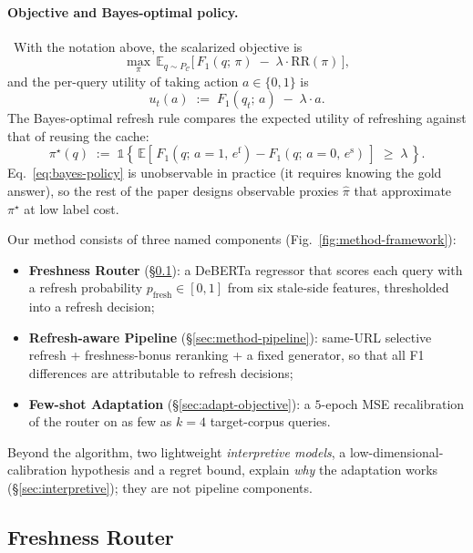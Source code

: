 \documentclass[pdflatex,sn-basic]{sn-jnl}
\begin{document}
\paragraph*{Objective and Bayes-optimal policy.}~With the notation above, the scalarized objective is
\begin{equation}
\label{eq:tradeoff}
\max_{\pi}\,\mathbb{E}_{q \sim P_{\mathcal{C}}}\big[\, F_1(q;\,\pi) \;-\; \lambda\cdot\mathrm{RR}(\pi)\,\big],
\end{equation}
and the per-query utility of taking action $a \in \{0,1\}$ is
\begin{equation}
\label{eq:utility}
u_t(a) \;:=\; F_1(q_t;\,a) \;-\; \lambda\cdot a.
\end{equation}
The Bayes-optimal refresh rule compares the expected utility of refreshing against that of reusing the cache:
\begin{equation}
\label{eq:bayes-policy}
\pi^\star(q) \;:=\; \mathbb{1}\!\left\{\,\mathbb{E}\!\left[\,F_1(q;\,a{=}1,\,e^{\mathrm{f}}) - F_1(q;\,a{=}0,\,e^{\mathrm{s}})\,\right] \;\ge\; \lambda\,\right\}.
\end{equation}
\noindent Eq.~\ref{eq:bayes-policy} is unobservable in practice (it requires knowing the gold answer), so the rest of the paper designs observable proxies $\hat\pi$ that approximate $\pi^\star$ at low label cost.

Our method consists of three named components (Fig.~\ref{fig:method-framework}):
\begin{itemize}
  \item \textbf{Freshness Router} (§\ref{sec:drift-aware}): a DeBERTa regressor that scores each query with a refresh probability $p_{\mathrm{fresh}} \in [0,1]$ from six stale-side features, thresholded into a refresh decision;
  \item \textbf{Refresh-aware Pipeline} (§\ref{sec:method-pipeline}): same-URL selective refresh + freshness-bonus reranking + a fixed generator, so that all F1 differences are attributable to refresh decisions;
  \item \textbf{Few-shot Adaptation} (§\ref{sec:adapt-objective}): a $5$-epoch MSE recalibration of the router on as few as $k{=}4$ target-corpus queries.
\end{itemize}
Beyond the algorithm, two lightweight \emph{interpretive models}, a low-dimensional-calibration hypothesis and a regret bound, explain \emph{why} the adaptation works (§\ref{sec:interpretive}); they are not pipeline components.

\subsection{Freshness Router}
\label{sec:drift-aware}
\end{document}
